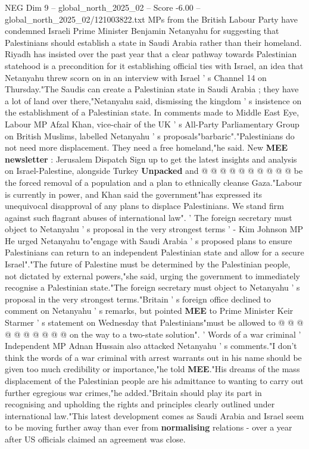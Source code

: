 \begin{textsample}{NEG Dim 9 – global\_north\_2025\_02 – Score -6.00 – global\_north\_2025\_02/121003822.txt}  \label{ex:f9_neg_020}
MPs from the British Labour Party have condemned Israeli Prime Minister Benjamin Netanyahu for suggesting that Palestinians should establish a state in Saudi Arabia rather than their homeland.
Riyadh has insisted over the past year that a clear pathway towards Palestinian statehood is a precondition for it establishing official ties with Israel, an idea that Netanyahu threw scorn on in an interview with Israel ' s Channel 14 on Thursday."The Saudis can create a Palestinian state in Saudi Arabia ; they have a lot of land over there,"Netanyahu said, dismissing the kingdom ' s insistence on the establishment of a Palestinian state.
In comments made to Middle East Eye, Labour MP Afzal Khan, vice-chair of the UK ' s All-Party Parliamentary Group on British Muslims, labelled Netanyahu ' s proposals"barbaric"."Palestinians do not need more displacement.
They need a free homeland,"he said.
New \textbf{MEE} \textbf{newsletter} : Jerusalem Dispatch Sign up to get the latest insights and analysis on Israel-Palestine, alongside Turkey \textbf{Unpacked} and @ @ @ @ @ @ @ @ @ @ be the forced removal of a population and a plan to ethnically cleanse Gaza."Labour is currently in power, and Khan said the government"has expressed its unequivocal disapproval of any plans to displace Palestinians.
We stand firm against such flagrant abuses of international law". ' The foreign secretary must object to Netanyahu ' s proposal in the very strongest terms ' - Kim Johnson MP He urged Netanyahu to"engage with Saudi Arabia ' s proposed plans to ensure Palestinians can return to an independent Palestinian state and allow for a secure Israel"."The future of Palestine must be determined by the Palestinian people, not dictated by external powers,"she said, urging the government to immediately recognise a Palestinian state."The foreign secretary must object to Netanyahu ' s proposal in the very strongest terms."Britain ' s foreign office declined to comment on Netanyahu ' s remarks, but pointed \textbf{MEE} to Prime Minister Keir Starmer ' s statement on Wednesday that Palestinians"must be allowed to @ @ @ @ @ @ @ @ @ @ on the way to a two-state solution". ' Words of a war criminal ' Independent MP Adnan Hussain also attacked Netanyahu ' s comments."I don't think the words of a war criminal with arrest warrants out in his name should be given too much credibility or importance,"he told \textbf{MEE}."His dreams of the mass displacement of the Palestinian people are his admittance to wanting to carry out further egregious war crimes,"he added."Britain should play its part in recognising and upholding the rights and principles clearly outlined under international law."This latest development comes as Saudi Arabia and Israel seem to be moving further away than ever from \textbf{normalising} relations - over a year after US officials claimed an agreement was close.

\end{textsample}
